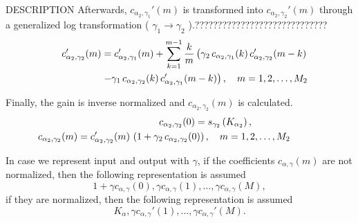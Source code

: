 \begin{qsection}{DESCRIPTION}
Afterwards, $c_{\alpha_2,\gamma_1}'(m)$ is transformed into 
$c_{\alpha_2,\gamma_2}'(m)$ through a generalized log transformation
( $\gamma_1 \rightarrow \gamma_2$ ).?????????????????????????????
\begin{eqnarray*}
\hspace{-15mm}&&c_{\alpha_2,\gamma_2}'(m) =
        c_{\alpha_2,\gamma_1}'(m)+\sum_{k=1}^{m-1} \frac{k}{m}
          \left( \gamma_2\,c_{\alpha_2,\gamma_1}(k)\,
	  c_{\alpha_2,\gamma_2}'(m-k) \right. \nonumber \\
\hspace{-15mm}&& \hspace{30mm} \left. -\gamma_1\,c_{\alpha_2,\gamma_2}(k)\,
          c_{\alpha_2,\gamma_1}'(m-k) \right), 
	  \quad m = 1, 2, \ldots, M_2 
\end{eqnarray*}

Finally, the gain is inverse normalized and $c_{\alpha_2,\gamma_2}(m)$
is calculated.
\begin{eqnarray*}
\hspace{-15mm}&&c_{\alpha_2,\gamma_2}(0)= 
	s_{\gamma_2}\left(K_{\alpha_2}\right), \qquad \qquad \\
\hspace{-15mm}&&c_{\alpha_2,\gamma_2}(m) =
          c_{\alpha_2,\gamma_2}'(m)\,\left(1+\gamma_2\, 
          c_{\alpha_2,\gamma_2}(0)\right), 
          \quad m = 1,2,\ldots, M_2
\end{eqnarray*}

In case we represent input and output with $\gamma$,
if the coefficients $c_{\alpha,\gamma}(m)$ are not normalized, then
the following representation is assumed
\begin{displaymath}
1+\gamma c_{\alpha,\gamma}(0), \gamma c_{\alpha,\gamma}(1), \ldots, \gamma c_{\alpha,\gamma}(M),
\end{displaymath}
if they are normalized, then
the following representation is assumed
\begin{displaymath}
K_\alpha,\gamma c_{\alpha,\gamma}'(1),\ldots, \gamma c_{\alpha,\gamma}'(M).
\end{displaymath}

\end{qsection}

\begin{options}
\end{options}

